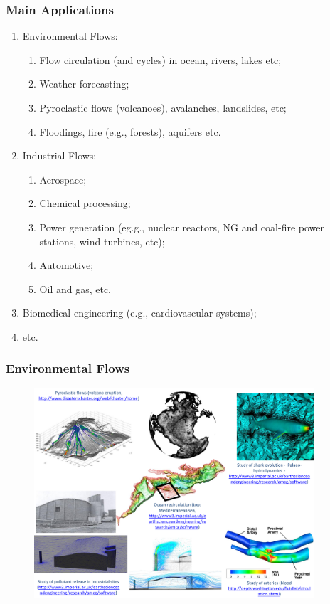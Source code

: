 \documentclass[10pt,compress,handout,ignorenonframetext]{beamer}
\begin{document}
\begin{frame}
 \frametitle{Main Applications} 
\begin{enumerate}
\item <1-> Environmental Flows:
  \begin{enumerate}
    \item <2-> Flow circulation (and cycles) in ocean, rivers, lakes etc;
    \item <3-> Weather forecasting;
    \item <4-> Pyroclastic flows (volcanoes), avalanches, landslides, etc;
    \item <5-> Floodings, fire (e.g., forests), aquifers etc.
  \end{enumerate}
\item <6-> Industrial Flows:
  \begin{enumerate}
    \item <7-> Aerospace;
    \item <8-> Chemical processing;
    \item <9-> Power generation (eg.g., nuclear reactors, NG and coal-fire power stations, wind turbines, etc);
    \item <10-> Automotive;
    \item <11-> Oil and gas, etc. 
  \end{enumerate}
\item <12-> Biomedical engineering (e.g., cardiovascular systems);
\item <13-> etc.
  
\end{enumerate}

\end{frame}


\begin{frame}
 \frametitle{Environmental Flows} 

   \begin{figure}%
    \begin{center}
     \includegraphics[width=12.cm, height=7.8cm, clip]{./Figs/EnvironmentallApplications.pdf}
    \end{center}
   \end{figure}    

\end{frame}
\end{document}
